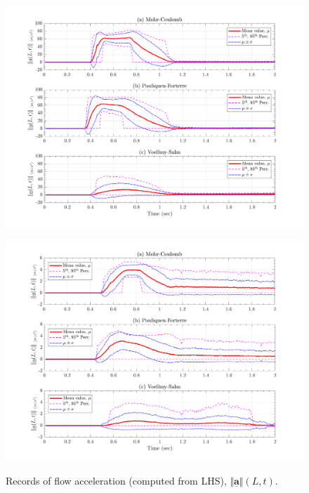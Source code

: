 \documentclass{article}
\begin{document}
\begin{figure}[H]
	\begin{minipage}[b]{0.5\linewidth}
    	\centering
    	\includegraphics[width=1\textwidth]{InclinedPlane/LocalRecords/Records/accel_L3L.png}
    	\label{fig:Ramp-L3-AccL}
	\end{minipage}
	\begin{minipage}[b]{0.5\linewidth}
		\centering
		\includegraphics[width=1\textwidth]{InclinedPlane/LocalRecords/Records/accel_L4L.png}
    	\label{fig:Ramp-L4-AccL}
    \end{minipage}
    \caption{Records of flow acceleration (computed from LHS), $\Vert \underline{\mathbf{a}} \Vert(L,t)$.}
    \label{fig:Ramp-LM-AccL}
\end{figure}
\end{document}
